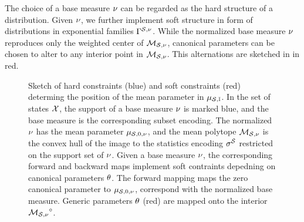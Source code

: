 
The choice of a base measure $\nu$ can be regarded as the hard structure of a distribution.
Given $\nu$, we further implement soft structure in form of distributions in exponential families $\Gamma^{\mathcal{S},\nu}$.
While the normalized base measure $\nu$ reproduces only the weighted center of $\mathcal{M}_{\mathcal{S},\nu}$, canonical parameters can be chosen to alter to any interior point in $\mathcal{M}_{\mathcal{S},\nu}$. %
This alternations are sketched in  in red.

\begin{figure}
    \begin{center}
        
    \end{center}
    \caption{
        Sketch of hard constraints (blue) and soft constraints (red) determing the position of the mean parameter in $\mu_{\mathcal{S},\mathbb{I}}$.
        In the set of states $\mathcal{X}$, the support of a base measure $\nu$ is marked blue, and the base measure is the corresponding subset encoding.
        The normalized $\nu$ has the mean parameter $\mu_{\mathcal{S},0,\nu}$, and the mean polytope $\mathcal{M}_{\mathcal{S},\nu}$ is the convex hull of the image to the statistics encoding $\sigma^{\mathcal{S}}$ restricted on the support set of $\nu$.
        Given a base measure $\nu$, the corresponding forward and backward maps implement soft contraints depedning on canonical parameters $\theta$.
        The forward mapping maps the zero canonical parameter to $\mu_{\mathcal{S},0,\nu}$, correspond with the normalized base measure.
        Generic parameters $\theta$ (red) are mapped onto the interior ${\mathcal{M}_{\mathcal{S},\nu}}^{\circ}$.
    }\label{fig:hs_mean_sketch}
\end{figure}


